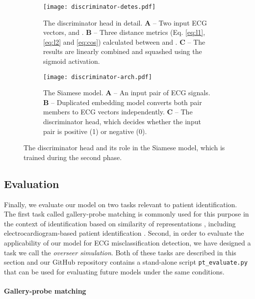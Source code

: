 \documentclass[preprint,12pt]{elsarticle}
\begin{document}
\begin{figure}[h]
    \centering
    \begin{subfigure}[b]{0.45\textwidth}
    \centering
    \texttt{[image: discriminator-detes.pdf]}
    \caption{The discriminator head in detail. \textbf{A} -- Two input ECG vectors,  and . \textbf{B} -- Three distance metrics (Eq. \ref{eq:l1}, \ref{eq:l2} and \ref{eq:cos}) calculated between  and . \textbf{C} -- The results are linearly combined and squashed using the sigmoid activation. }
    \label{fig:discriminator-detail}
    \end{subfigure}
    \hfill
    \begin{subfigure}[b]{0.45\textwidth}
    \centering
    \texttt{[image: discriminator-arch.pdf]}
    \caption{The Siamese model. \textbf{A} -- An input pair of ECG signals. \textbf{B} -- Duplicated embedding model converts both pair members to ECG vectors independently. \textbf{C} -- The discriminator head, which decides whether the input pair is positive (1) or negative (0). }
    \label{fig:siamese-model}
    \end{subfigure}
    \hfill
    \caption{The discriminator head and its role in the Siamese model, which is trained during the second phase.}
    \label{fig:discriminator-arch}
\end{figure}



\subsection{Evaluation}
\label{sec:mistake-detection}

Finally, we evaluate our model on two tasks relevant to patient identification. The first task called gallery-probe matching is commonly used for this purpose in the context of identification based on similarity of representations \cite{cheng2011custom, hossain2010clothing, gross2006model, shen2018person}, including electrocardiogram-based patient identification \cite{oh2022lead}. Second, in order to evaluate the applicability of our model for ECG misclassification detection, we have designed a task we call the \textit{overseer simulation}. Both of these tasks are described in this section and our GitHub repository contains a stand-alone script \verb|pt_evaluate.py| that can be used for evaluating future models under the same conditions.

\paragraph{Gallery-probe matching}
\end{document}
